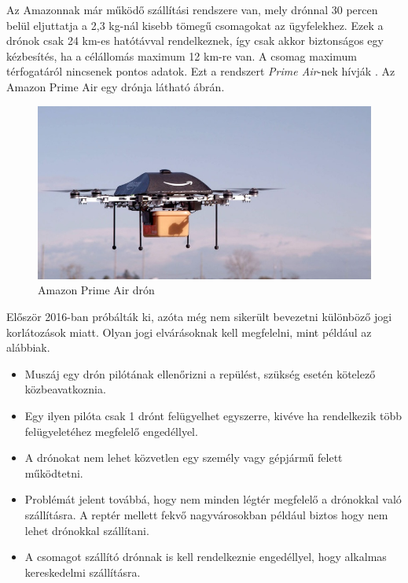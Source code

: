 

Az Amazonnak már működő szállítási rendszere van, mely drónnal 30 percen belül eljuttatja a 2,3 kg-nál kisebb tömegű csomagokat az ügyfelekhez.
Ezek a drónok csak 24 km-es hatótávval rendelkeznek, így csak akkor biztonságos egy kézbesítés, ha a célállomás maximum 12 km-re van.
A csomag maximum térfogatáról nincsenek pontos adatok.
Ezt a rendszert \textit{Prime Air}-nek hívják \cite{prime-air}. Az Amazon Prime Air egy drónja látható  ábrán.

\begin{figure}[h]
    \centering
    \includegraphics[scale=0.4]{images/prime.jpg}
    \caption{Amazon Prime Air drón}
    \label{fig:prime}
\end{figure}

Először 2016-ban próbálták ki, azóta még nem sikerült bevezetni különböző jogi korlátozások miatt. Olyan jogi elvárásoknak \cite{drone-approval-legal-reasons} kell megfelelni, mint például az alábbiak.
\begin{itemize}
    \item Muszáj egy drón pilótának ellenőrizni a repülést, szükség esetén kötelező közbeavatkoznia.
    \item Egy ilyen pilóta csak 1 drónt felügyelhet egyszerre, kivéve ha rendelkezik több felügyeletéhez megfelelő engedéllyel.
    \item A drónokat nem lehet közvetlen egy személy vagy gépjármű felett működtetni.
    \item Problémát jelent továbbá, hogy nem minden légtér megfelelő a drónokkal való szállításra. A reptér mellett fekvő nagyvárosokban például biztos hogy nem lehet drónokkal szállítani.
    \item A csomagot szállító drónnak is kell rendelkeznie engedéllyel, hogy alkalmas kereskedelmi szállításra.
\end{itemize}

